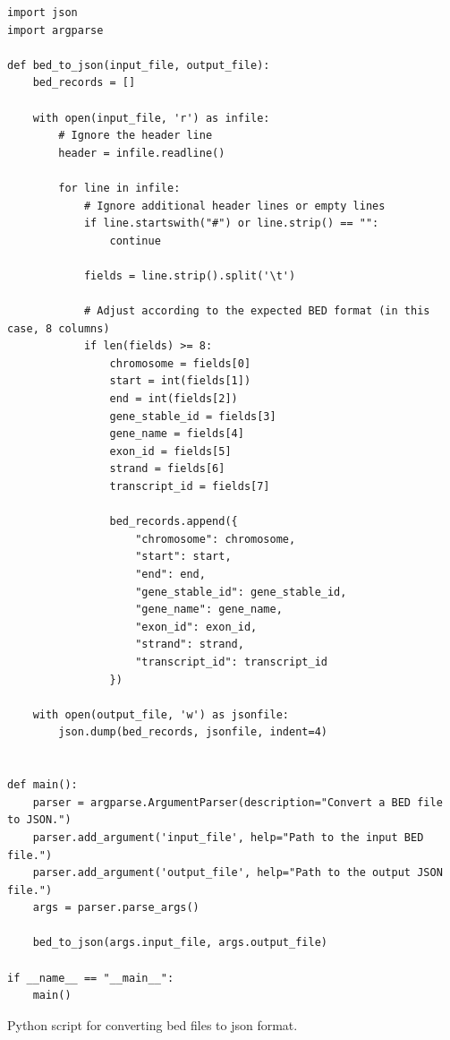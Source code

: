 \begin{longlisting}
\begin{verbatim}
import json
import argparse

def bed_to_json(input_file, output_file):
    bed_records = []

    with open(input_file, 'r') as infile:
        # Ignore the header line
        header = infile.readline()

        for line in infile:
            # Ignore additional header lines or empty lines
            if line.startswith("#") or line.strip() == "":
                continue

            fields = line.strip().split('\t')
            
            # Adjust according to the expected BED format (in this case, 8 columns)
            if len(fields) >= 8:
                chromosome = fields[0]
                start = int(fields[1])
                end = int(fields[2])
                gene_stable_id = fields[3]
                gene_name = fields[4]
                exon_id = fields[5]
                strand = fields[6]
                transcript_id = fields[7]

                bed_records.append({
                    "chromosome": chromosome,
                    "start": start,
                    "end": end,
                    "gene_stable_id": gene_stable_id,
                    "gene_name": gene_name,
                    "exon_id": exon_id,
                    "strand": strand,
                    "transcript_id": transcript_id
                })

    with open(output_file, 'w') as jsonfile:
        json.dump(bed_records, jsonfile, indent=4)


def main():
    parser = argparse.ArgumentParser(description="Convert a BED file to JSON.")
    parser.add_argument('input_file', help="Path to the input BED file.")
    parser.add_argument('output_file', help="Path to the output JSON file.")
    args = parser.parse_args()

    bed_to_json(args.input_file, args.output_file)

if __name__ == "__main__":
    main()
\end{verbatim}
\caption{Python script for converting \ac{bed} files to \ac{json} format.}
\label{lbl:bed_to_json_script}
\end{longlisting}

